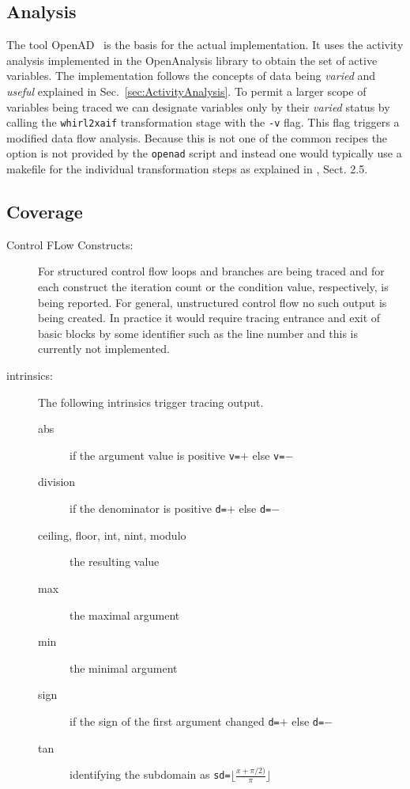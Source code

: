 \documentclass{article}
\newcommand{\openad}{OpenAD}
\newcommand{\refsec}[1]{{Sec.~\ref{#1}}}
\begin{document}
\subsection{Analysis}\label{sec:analysis}
 
The tool \openad\ \cite{openad} is the basis for the actual implementation. 
It uses the activity analysis implemented in the OpenAnalysis \cite{oaWeb} library 
to obtain the set of active variables. 
The implementation follows the concepts of data being {\em varied} and {\em useful}
explained in \refsec{sec:ActivityAnalysis}. 
To permit a larger scope of variables being traced we can designate variables only 
by their {\em varied} status by calling the \lstinline{whirl2xaif} transformation stage 
with the \lstinline{-v} flag. This flag triggers a modified data flow analysis. 
Because this is not one of the common recipes the option is not provided by 
the \lstinline{openad} script and instead one would typically use a makefile 
for the individual transformation steps as explained in  \cite{userManual}, Sect. 2.5.
      
\subsection{Coverage}
\begin{description}
\item[Control FLow Constructs:] For structured control flow  loops and branches are being traced 
and for each construct the iteration count or the condition value, respectively, is being reported. 
For general, unstructured control flow no such output is being created. In practice 
it would require tracing entrance and exit of basic blocks by some identifier such as the line number
and this is currently not implemented.
\item[intrinsics:] The following intrinsics trigger tracing output.
\begin{description}
\item[abs] if the argument value is positive \lstinline{v=}$+$ else \lstinline{v=}$-$
\item[division] if the denominator is positive \lstinline{d=}$+$ else \lstinline{d=}$-$   
\item[ceiling, floor, int, nint, modulo] the resulting value
\item[max] the maximal argument
\item[min] the minimal argument
\item[sign] if the sign of the first argument changed \lstinline{d=}$+$ else \lstinline{d=}$-$
\item[tan] identifying the subdomain as \lstinline{sd=}$\lfloor\frac{x+\pi/2)}{\pi}\rfloor$ 
\end{description}
\end{description}
\end{document}
